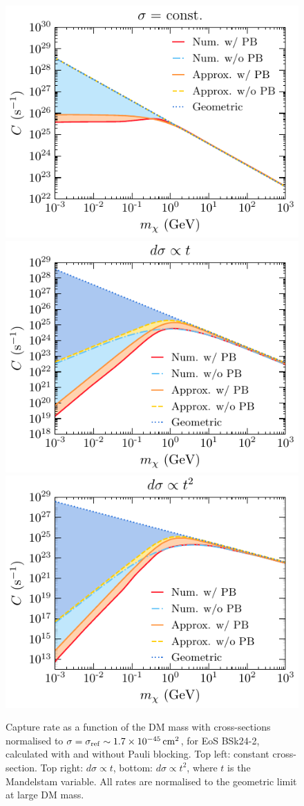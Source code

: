 \begin{figure}
    \centering
    \includegraphics[width=.48\textwidth]{capture_1/capture_rate_n0.pdf}
    \includegraphics[width=.48\textwidth]{capture_1/capture_rate_n1.pdf}\\
    \includegraphics[width=.48\textwidth]{capture_1/capture_rate_n2.pdf}
    \caption[Capture rate as a function of the DM mass with cross-sections normalised to $\sigma=\sigmaref\sim 1.7 \times 10^{-45} \cm^2$, for EoS BSk24-2, calculated with and without Pauli blocking.]{Capture rate as a function of the DM mass with cross-sections normalised to $\sigma=\sigmaref\sim 1.7 \times 10^{-45} \cm^2$, for EoS BSk24-2, calculated with and without Pauli blocking. Top left: constant cross-section. Top right: $d\sigma\propto t$, bottom: $d\sigma\propto t^2$, where $t$ is the Mandelstam variable. All rates are normalised to the geometric limit at large DM mass. }
    \label{ch3:fig:approxc}
\end{figure}


